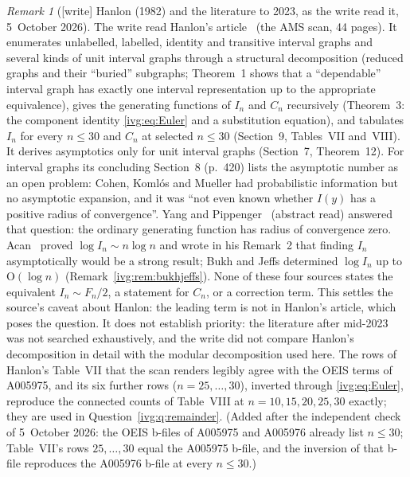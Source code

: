 \documentclass[11pt,letterpaper]{article}
\theoremstyle{definition}\newtheorem{definition}[theorem]{Definition}
\theoremstyle{remark}\newtheorem{remark}[theorem]{Remark}
\newcommand{\OO}{\mathrm O}
\begin{document}
\begin{remark}[{[write]} Hanlon (1982) and the literature to 2023, as the write read it, 5~October 2026]\label{ivg:rem:hanlon}
The write read Hanlon's article~\cite{Hanlon} (the AMS scan, 44 pages). It
enumerates unlabelled, labelled, identity and transitive interval graphs and
several kinds of unit interval graphs through a structural decomposition
(reduced graphs and their ``buried'' subgraphs; Theorem~1 shows that a
``dependable'' interval graph has exactly one interval representation up to
the appropriate equivalence), gives the generating functions of $I_n$ and
$C_n$ recursively (Theorem~3: the component identity \eqref{ivg:eq:Euler} and
a substitution equation), and tabulates $I_n$ for every $n\le30$ and $C_n$
at selected $n\le30$ (Section~9, Tables~VII and~VIII). It derives asymptotics only for unit
interval graphs (Section~7, Theorem~12). For interval graphs its concluding
Section~8 (p.~420) lists the asymptotic number as an open problem: Cohen,
Koml\'os and Mueller had probabilistic information but no asymptotic
expansion, and it was ``not even known whether $I(y)$ has a positive radius
of convergence''. Yang and Pippenger~\cite{YP} (abstract read) answered
that question: the ordinary generating function has radius of convergence
zero. Acan~\cite{Acan} proved $\log I_n\sim n\log n$ and wrote in his
Remark~2 that finding $I_n$ asymptotically would be a strong result; Bukh
and Jeffs determined $\log I_n$ up to $\OO(\log n)$
(Remark~\ref{ivg:rem:bukhjeffs}). None of these four sources states the
equivalent $I_n\sim F_n/2$, a statement for $C_n$, or a correction term.
This settles the source's caveat about Hanlon: the leading term is not in
Hanlon's article, which poses the question. It does not establish
priority: the literature after mid-2023 was not searched exhaustively, and
the write did not compare Hanlon's decomposition in detail with the modular
decomposition used here. The rows of Hanlon's Table~VII that the scan
renders legibly agree with the OEIS terms of A005975, and its six further
rows ($n=25,\dots,30$), inverted through \eqref{ivg:eq:Euler}, reproduce the
connected counts of Table~VIII at $n=10,15,20,25,30$ exactly; they are used
in Question~\ref{ivg:q:remainder}. \textup{(Added after the independent check
of 5~October 2026: the OEIS b-files of A005975 and A005976 already list
$n\le30$; Table~VII's rows $25,\dots,30$ equal the A005975 b-file, and the
inversion of that b-file reproduces the A005976 b-file at every $n\le30$.)}
\end{remark}
\end{document}
